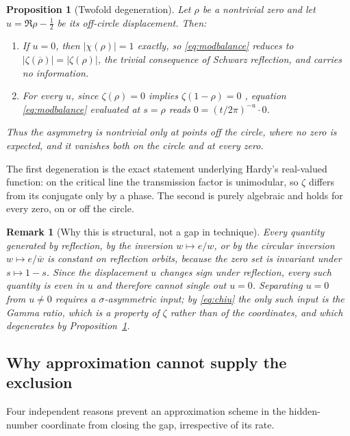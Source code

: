 \documentclass[submission,noinfoline]{jsfds}
\newtheorem{proposition}[theorem]{Proposition}
\newtheorem*{remark}{Remark}
\newcommand{\Lean}[1]{}
\newcommand{\abs}[1]{\lvert #1\rvert}
\begin{document}
\begin{proposition}[Twofold degeneration]\label{prop:degeneration}
Let $\rho$ be a nontrivial zero and let $u=\Re\rho-\tfrac12$ be its
off-circle displacement. Then:
\begin{enumerate}
\item If $u=0$, then $\abs{\chi(\rho)}=1$ exactly, so \eqref{eq:modbalance}
reduces to $\abs{\zeta(\overline\rho)}=\abs{\zeta(\rho)}$, the trivial
consequence of Schwarz reflection, and carries no information.
\item For every $u$, since $\zeta(\rho)=0$ implies $\zeta(1-\rho)=0$
\Lean{zeta_zero_iff_one_sub}, equation \eqref{eq:modbalance} evaluated at
$s=\rho$ reads $0=(t/2\pi)^{-u}\cdot 0$.
\end{enumerate}
Thus the asymmetry is nontrivial only at points off the circle, where no zero
is expected, and it vanishes both on the circle and at every zero.
\end{proposition}

The first degeneration is the exact statement underlying Hardy's real-valued
function: on the critical line the transmission factor is unimodular, so
$\zeta$ differs from its conjugate only by a phase. The second is purely
algebraic and holds for every zero, on or off the circle.

\begin{remark}[Why this is structural, not a gap in technique]
Every quantity generated by reflection, by the inversion $w\mapsto e/w$, or
by the circular inversion $w\mapsto e/\overline w$ is constant on reflection
orbits, because the zero set is invariant under $s\mapsto1-s$. Since the
displacement $u$ changes sign under reflection, every such quantity is even
in $u$ and therefore cannot single out $u=0$. Separating $u=0$ from $u\neq0$
requires a $\sigma$-asymmetric input; by \eqref{eq:chiu} the only such input
is the Gamma ratio, which is a property of $\zeta$ rather than of the
coordinates, and which degenerates by
Proposition~\ref{prop:degeneration}.
\end{remark}

\subsection{Why approximation cannot supply the exclusion}

Four independent reasons prevent an approximation scheme in the hidden-number
coordinate from closing the gap, irrespective of its rate.
\end{document}
